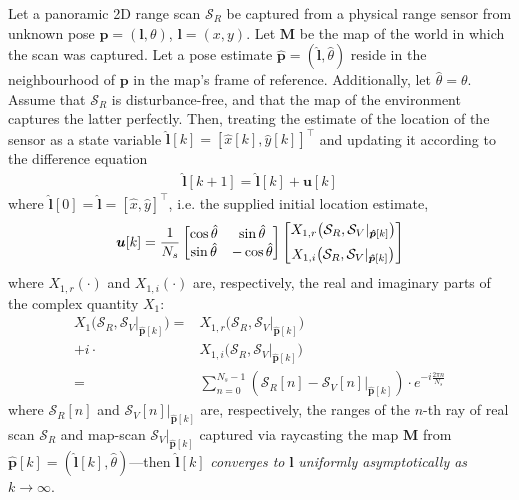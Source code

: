\begin{theorem}
  \label{prop:theorem_without_disturbance}
  Let a panoramic 2D range scan $\mathcal{S}_R$ be captured from a physical
  range sensor from unknown pose $\bm{p} = (\bm{l},\theta)$, $\bm{l} = (x,y)$.
  Let $\bm{M}$ be the map of the world in which the scan was captured. Let a
  pose estimate $\hat{\bm{p}} = (\hat{\bm{l}}, \hat{\theta})$ reside in the
  neighbourhood of $\bm{p}$ in the map's frame of reference. Additionally, let
  $\hat{\theta} = \theta$. Assume that $\mathcal{S}_R$ is disturbance-free,
  and that the map of the environment captures the latter perfectly. Then,
  treating the estimate of the location of the sensor as a state variable
  $\hat{\bm{l}}[k] = [\hat{x}[k], \hat{y}[k]]^\top$ and updating it according
  to the difference equation
  \begin{align}
    \hat{\bm{l}}[k+1] = \hat{\bm{l}}[k] + \bm{u}[k]
    \label{eq:difference_equation_without_disturbance}
  \end{align}
  where $\hat{\bm{l}}[0] = \hat{\bm{l}} = [\hat{x}, \hat{y}]^{\top}$,
  i.e. the supplied initial location estimate,
  \begin{align}
    \bm{u}[k] = \dfrac{1}{N_s}
    \begin{bmatrix}
      \cos\hat{\theta} & \sin\hat{\theta} \\
      \sin\hat{\theta} & - \cos\hat{\theta}
    \end{bmatrix}
    \begin{bmatrix}
      X_{1,r}\big(\mathcal{S}_R, \mathcal{S}_V|_{\bm{\hat{p}}[k]}\big) \vspace{0.2cm} \\
      X_{1,i}\big(\mathcal{S}_R, \mathcal{S}_V|_{\bm{\hat{p}}[k]}\big)
    \end{bmatrix}
    \label{eq:control_vector_without_disturbance}
  \end{align}
  where $X_{1,r}(\cdot)$ and $X_{1,i}(\cdot)$ are, respectively, the real and
  imaginary parts of the complex quantity $X_1$:
  \begin{align}
    X_1\big(\mathcal{S}_R, \mathcal{S}_V|_{\bm{\hat{p}}[k]}\big) =
      &X_{1,r}\big(\mathcal{S}_R, \mathcal{S}_V|_{\bm{\hat{p}}[k]}\big) \nonumber \\
      + i \cdot &X_{1,i}\big(\mathcal{S}_R, \mathcal{S}_V|_{\bm{\hat{p}}[k]}\big) \nonumber \\
      = &\sum\limits_{n=0}^{N_s-1}(\mathcal{S}_R[n] - \mathcal{S}_V[n]|_{\bm{\hat{p}}[k]}) \cdot e^{-i \frac{2 \pi n}{N_s}} \label{eq:X1}
  \end{align}
  where $\mathcal{S}_R[n]$ and $\mathcal{S}_V[n]|_{\bm{\hat{p}}[k]}$ are,
  respectively, the ranges of the $n$-th ray of real scan $\mathcal{S}_R$ and
  map-scan $\mathcal{S}_V|_{\bm{\hat{p}}[k]}$ captured via raycasting the map
  $\bm{M}$ from $\bm{\hat{p}}[k] = (\hat{\bm{l}}[k], \hat{\theta})$---then
  $\hat{\bm{l}}[k]$ \textit{converges to} $\bm{l}$ \textit{uniformly
  asymptotically as} $k \rightarrow \infty$.
\end{theorem}

